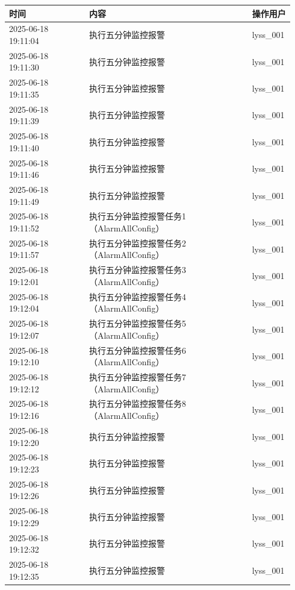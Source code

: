 \documentclass[UTF8,10pt,a4paper,fontset=fandol]{ctexart}
\begin{document}
\begin{center}
\small
\begin{tabular}{|p{0.27\linewidth}|p{0.55\linewidth}|p{0.12\linewidth}|}
\hline
\textbf{时间} & \textbf{内容} & \textbf{操作用户}\\
\hline
2025-06-18 19:11:04 & 执行五分钟监控报警 & lyss\_001\\
\hline
2025-06-18 19:11:30 & 执行五分钟监控报警 & lyss\_001\\
\hline
2025-06-18 19:11:35 & 执行五分钟监控报警 & lyss\_001\\
\hline
2025-06-18 19:11:39 & 执行五分钟监控报警 & lyss\_001\\
\hline
2025-06-18 19:11:40 & 执行五分钟监控报警 & lyss\_001\\
\hline
2025-06-18 19:11:46 & 执行五分钟监控报警 & lyss\_001\\
\hline
2025-06-18 19:11:49 & 执行五分钟监控报警 & lyss\_001\\
\hline
2025-06-18 19:11:52 & 执行五分钟监控报警任务1（AlarmAllConfig） & lyss\_001\\
\hline
2025-06-18 19:11:57 & 执行五分钟监控报警任务2（AlarmAllConfig） & lyss\_001\\
\hline
2025-06-18 19:12:01 & 执行五分钟监控报警任务3（AlarmAllConfig） & lyss\_001\\
\hline
2025-06-18 19:12:04 & 执行五分钟监控报警任务4（AlarmAllConfig） & lyss\_001\\
\hline
2025-06-18 19:12:07 & 执行五分钟监控报警任务5（AlarmAllConfig） & lyss\_001\\
\hline
2025-06-18 19:12:10 & 执行五分钟监控报警任务6（AlarmAllConfig） & lyss\_001\\
\hline
2025-06-18 19:12:12 & 执行五分钟监控报警任务7（AlarmAllConfig） & lyss\_001\\
\hline
2025-06-18 19:12:16 & 执行五分钟监控报警任务8（AlarmAllConfig） & lyss\_001\\
\hline
2025-06-18 19:12:20 & 执行五分钟监控报警 & lyss\_001\\
\hline
2025-06-18 19:12:23 & 执行五分钟监控报警 & lyss\_001\\
\hline
2025-06-18 19:12:26 & 执行五分钟监控报警 & lyss\_001\\
\hline
2025-06-18 19:12:29 & 执行五分钟监控报警 & lyss\_001\\
\hline
2025-06-18 19:12:32 & 执行五分钟监控报警 & lyss\_001\\
\hline
2025-06-18 19:12:35 & 执行五分钟监控报警 & lyss\_001\\

\end{tabular}
\end{center}
\end{document}
